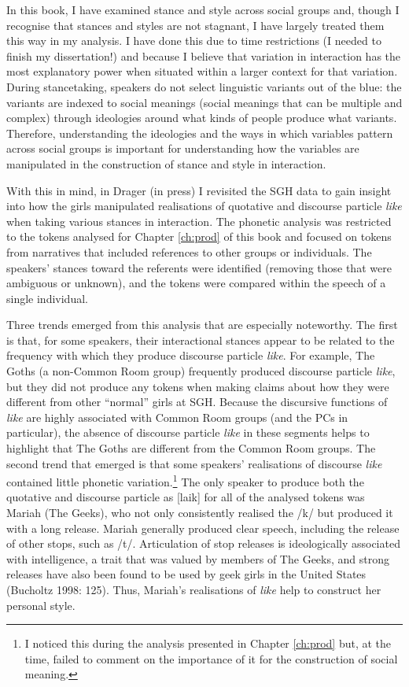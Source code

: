 In this book, I have examined stance and style across social groups and, though I recognise that stances and styles are not stagnant, I have largely treated them this way in my analysis.  I have done this due to time restrictions (I needed to finish my dissertation!) and because I believe that variation in interaction has the most explanatory power when situated within a larger context for that variation.  During stancetaking, speakers do not select linguistic variants out of the blue: the variants are indexed to social meanings (social meanings that can be multiple and complex) through ideologies around what kinds of people produce what variants.  Therefore, understanding the ideologies and the ways in which variables pattern across social groups is important for understanding how the variables are manipulated in the construction of stance and style in interaction.

With this in mind, in Drager (in press) I revisited the SGH data to gain insight into how the girls manipulated realisations of quotative and discourse particle \textit{like} when taking various stances in interaction.  The phonetic analysis was restricted to the tokens analysed for Chapter \ref{ch:prod} of this book and focused on tokens from narratives that included references to other groups or individuals.  The speakers' stances toward the referents were identified (removing those that were ambiguous or unknown), and the tokens were compared within the speech of a single individual.  
\nocite{dragerinpress-DPVC}

Three trends emerged from this analysis that are especially noteworthy.  The first is that, for some speakers, their interactional stances appear to be related to the frequency with which they produce discourse particle \textit{like}.  For example, The Goths (a non-Common Room group) frequently produced discourse particle \textit{like}, but they did not produce any tokens when making claims about how they were different from other ``normal'' girls at SGH.  Because the discursive functions of \textit{like} are highly associated with Common Room groups (and the PCs in particular), the absence of discourse particle \textit{like} in these segments helps to highlight that The Goths are different from the Common Room groups.  The second trend that emerged is that some speakers' realisations of discourse \textit{like} contained little phonetic variation.\footnote{I noticed this during the analysis presented in Chapter \ref{ch:prod} but, at the time, failed to comment on the importance of it for the construction of social meaning.}  The only speaker to produce both the quotative and discourse particle as [laik] for all of the analysed tokens was Mariah (The Geeks), who not only consistently realised the /k/ but produced it with a long release.  Mariah generally produced clear speech, including the release of other stops, such as /t/.  Articulation of stop releases is ideologically associated with intelligence, a trait that was valued by members of The Geeks, and strong releases have also been found to be used by geek girls in the United States (Bucholtz 1998: 125). Thus, Mariah's realisations of \textit{like} help to construct her personal style. 
\nocite{bucholtz1998}

